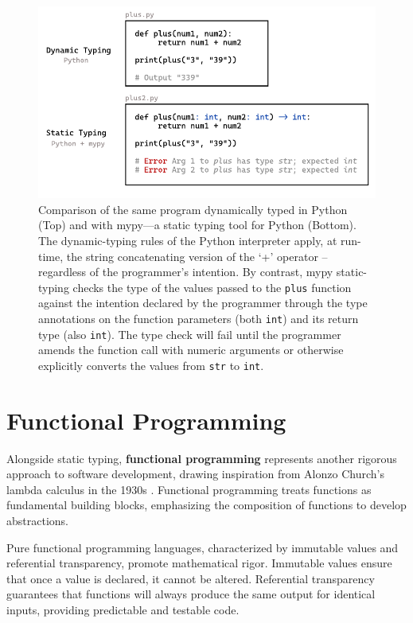 \begin{figure}[hbt]
  \includegraphics[width=\linewidth]{TypedVsUntyped.pdf}
  \caption{
    \label{fig:typed-vs-untyped}
    Comparison of the same program dynamically typed in Python (Top) and with mypy—a static typing tool for Python (Bottom).  The dynamic-typing rules of the Python interpreter apply, at run-time, the string concatenating version of the `+' operator -- regardless of the programmer's intention.  By contrast, mypy static-typing checks the type of the values passed to the {\tt plus} function against the intention declared by the programmer through the type annotations on the function parameters (both {\tt int}) and its return type (also {\tt int}).  The type check will fail until the programmer amends the function call with numeric arguments or otherwise explicitly converts the values from {\tt str} to {\tt int}.
    }
\end{figure}



\section{Functional Programming}

Alongside static typing, \textbf{functional programming} represents another rigorous approach to software development, drawing inspiration from Alonzo Church's lambda calculus in the 1930s \cite{Church1985-bx}. Functional programming treats functions as fundamental building blocks, emphasizing the composition of functions to develop abstractions.

Pure functional programming languages, characterized by immutable values and referential transparency, promote mathematical rigor. Immutable values ensure that once a value is declared, it cannot be altered. Referential transparency guarantees that functions will always produce the same output for identical inputs, providing predictable and testable code.


